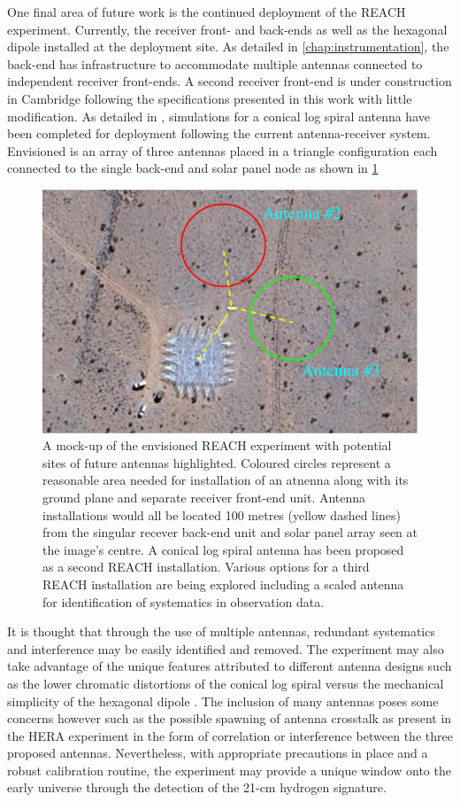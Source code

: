 One final area of future work is the continued deployment of the REACH experiment. Currently, the receiver front- and back-ends as well as the hexagonal dipole installed at the deployment site. As detailed in \cref{chap:instrumentation}, the back-end has infrastructure to accommodate multiple antennas connected to independent receiver front-ends. A second receiver front-end is under construction in Cambridge following the specifications presented in this work with little modification. As detailed in \citet{reach}, simulations for a conical log spiral antenna have been completed for deployment following the current antenna-receiver system. Envisioned is an array of three antennas placed in a triangle configuration each connected to the single back-end and solar panel node as shown in \cref{fig:reach_prime}
\begin{figure}
    \centering
    \includegraphics[width=.7\textwidth]{reach_prime}
    \caption{A mock-up of the envisioned REACH experiment with potential sites of future antennas highlighted. Coloured circles represent a reasonable area needed for installation of an atnenna along with its ground plane and separate receiver front-end unit. Antenna installations would all be located 100 metres (yellow dashed lines) from the singular recever back-end unit and solar panel array seen at the image's centre. A conical log spiral antenna has been proposed as a second REACH installation. Various options for a third REACH installation are being explored including a scaled antenna for identification of systematics in observation data.}
    \label{fig:reach_prime}
\end{figure}
It is thought that through the use of multiple antennas, redundant systematics and interference may be easily identified and removed. The experiment may also take advantage of the unique features attributed to different antenna designs such as the lower chromatic distortions of the conical log spiral versus the mechanical simplicity of the hexagonal dipole \citep{dom_antenna,john_antenna,reach}. The inclusion of many antennas poses some concerns however such as the possible spawning of antenna crosstalk as present in the HERA experiment \citep{hera_crosstalk} in the form of correlation or interference between the three proposed antennas. Nevertheless, with appropriate precautions in place and a robust calibration routine, the experiment may provide a unique window onto the early universe through the detection of the 21-cm hydrogen signature.

